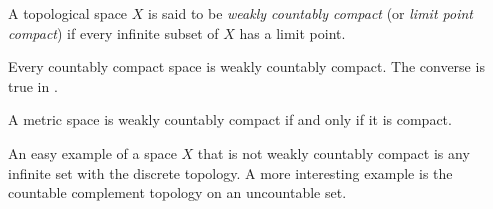 \documentclass[12pt]{article}
\begin{document}
A topological space $X$ is said to be \emph{weakly countably compact}
(or \emph{limit point compact})
if every infinite subset of $X$ has a limit point.

Every countably compact space is weakly countably compact.
The converse is true in .

A metric space is weakly countably compact if and only if it is compact.

An easy example of a space $X$
that is not weakly countably compact
is any infinite set with the discrete topology.
A more interesting example is the countable complement topology
on an uncountable set.

\end{document}
